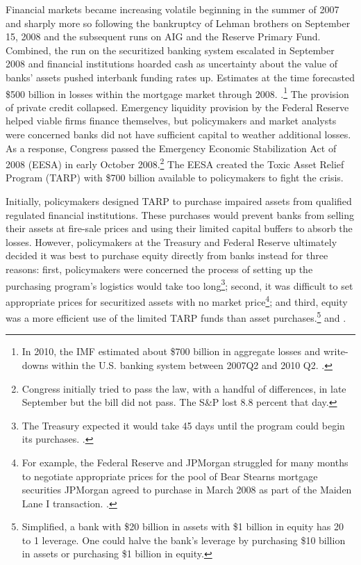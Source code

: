 \documentclass[12pt]{article}
\begin{document}
Financial markets became increasing volatile beginning in the summer of 2007 and sharply more so following the bankruptcy of Lehman brothers on September 15, 2008 and the subsequent runs on AIG and the Reserve Primary Fund. Combined, the run on the securitized banking system escalated in September 2008 and financial institutions hoarded cash as uncertainty about the value of banks' assets pushed interbank funding rates up. Estimates at the time forecasted \$500 billion in losses within the mortgage market through 2008. \citep{Greenlaw}.\footnote{In 2010, the IMF estimated about \$700 billion in aggregate losses and write-downs within the U.S. banking system between 2007Q2 and 2010 Q2. \citep{IMF2010}.} The provision of private credit collapsed. Emergency liquidity provision by the Federal Reserve helped viable firms finance themselves, but policymakers and market analysts were concerned banks did not have sufficient capital to weather additional losses. As a response, Congress passed the Emergency Economic Stabilization Act of 2008 (EESA) in early October 2008.\footnote{Congress initially tried to pass the law, with a handful of differences, in late September but the bill did not pass. The S\&P lost 8.8 percent that day.} The EESA created the Toxic Asset Relief Program (TARP) with \$700 billion available to policymakers to fight the crisis.

Initially, policymakers designed TARP to purchase impaired assets from qualified regulated financial institutions. These purchases would prevent banks from selling their assets at fire-sale prices and using their limited capital buffers to absorb the losses. However, policymakers at the Treasury and Federal Reserve ultimately decided it was best to purchase equity directly from banks instead for three reasons: first, policymakers were concerned the process of setting up the purchasing program's logistics would take too long\footnote{The Treasury expected it would take 45 days until the program could begin its purchases. \citep{Geithner}.}; second, it was difficult to set appropriate prices for securitized assets with no market price\footnote{For example, the Federal Reserve and JPMorgan struggled for many months to negotiate appropriate prices for the pool of Bear Stearns mortgage securities JPMorgan agreed to purchase in March 2008 as part of the Maiden Lane I transaction. \citep{Geithner}.}; and third, equity was a more efficient use of the limited TARP funds than asset purchases.\footnote{Simplified, a bank with \$20 billion in assets with \$1 billion in equity has 20 to 1 leverage. One could halve the bank's leverage by purchasing \$10 billion in assets or purchasing \$1 billion in equity.} \citep{Geithner} and \citep{paulsonbook}.
\end{document}
